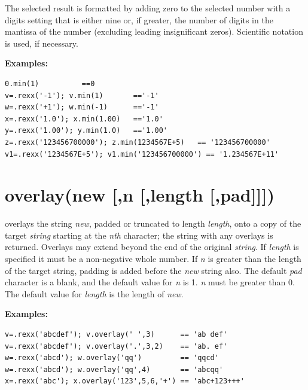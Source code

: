 The selected result is formatted by adding zero to the selected number
with a digits setting that is either nine or, if greater, the number of
digits in the mantissa of the number (excluding leading insignificant
zeros).
Scientific notation is used, if necessary.
 
\textbf{Examples:}
\begin{lstlisting}
0.min(1)          ==0
v=.rexx('-1'); v.min(1)       =='-1'
w=.rexx('+1'); w.min(-1)      =='-1'
x=.rexx('1.0'); x.min(1.00)   =='1.0'
y=.rexx('1.00'); y.min(1.0)   =='1.00'
z=.rexx('123456700000'); z.min(1234567E+5)   == '123456700000'
v1=.rexx('1234567E+5'); v1.min('123456700000') == '1.234567E+11'
\end{lstlisting}

\section{overlay(new [,n [,length [,pad{]]]})}\label{refoverlay}
overlays the string \emph{new}, padded or truncated to length
\emph{length}, onto a copy of the target \emph{string} starting
at the \emph{n}\emph{th} character; the string with any overlays is
returned.  Overlays may extend beyond the end of the original
\emph{string}.
If \emph{length} is specified it must be a non-negative whole
number.
If \emph{n} is greater than the length of
the target string, padding is added before the \emph{new} string
also.
The default \emph{pad} character is a blank, and the default value
for \emph{n} is 1.
\emph{n} must be greater than 0.
The default value for \emph{length} is the length of \emph{new}.
 
\textbf{Examples:}
\begin{lstlisting}
v=.rexx('abcdef'); v.overlay(' ',3)      == 'ab def'
v=.rexx('abcdef'); v.overlay('.',3,2)    == 'ab. ef'
w=.rexx('abcd'); w.overlay('qq')         == 'qqcd'
w=.rexx('abcd'); w.overlay('qq',4)       == 'abcqq'
x=.rexx('abc'); x.overlay('123',5,6,'+') == 'abc+123+++'
\end{lstlisting}

